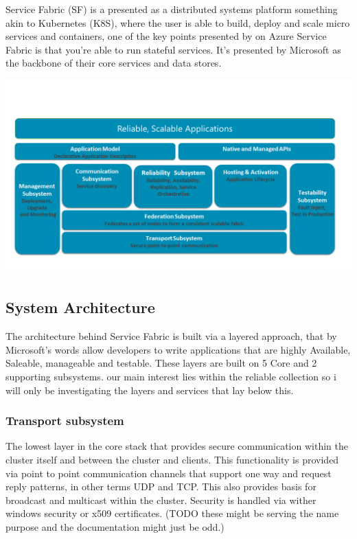 \documentclass[a4paper,10pt,titlepage]{report}
\begin{document}
Service Fabric (SF) is a presented as a distributed systems platform something akin to Kubernetes (K8S), where the user is able to build, deploy and scale micro services and containers, one of the key points presented by on Azure Service Fabric is that you're able to run stateful services. It's presented by Microsoft as the backbone of their core services and data stores.\\
\vspace{5mm}

\includegraphics[scale=0.5]{images/service-fabric-architecture.png}

\subsection{System Architecture}

The architecture behind Service Fabric is built via a layered approach, that by Microsoft's words allow developers to write applications that are highly Available, Saleable, manageable and testable. These layers are built on 5 Core and 2 supporting subsystems.  our main interest lies within the reliable collection so i will only be investigating the layers and services that lay below this.\\
\vspace{5mm}



\subsubsection{Transport subsystem}

The lowest layer in the core stack that provides secure communication within the cluster itself and between the cluster and clients. This functionality is provided via point to point communication channels that support one way and request reply patterns, in other terms UDP and TCP. This also provides basis for broadcast and multicast within the cluster. Security is handled via wither windows security or x509 certificates. (TODO these might be serving the name purpose and the documentation might just be odd.)\\
\vspace{5mm}
\end{document}
